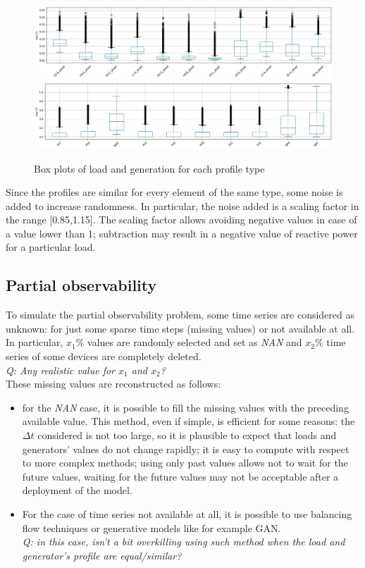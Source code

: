 \begin{figure}[H]
\centering
    \includegraphics[width=.8\linewidth]{images/MVOberr/BoxPlotLoad.png}
    \includegraphics[width=.8\linewidth]{images/MVOberr/BoxPlotRes.png}
\caption{Box plots of load and generation for each profile type}
\label{fig:gym_anm_net}
\end{figure}

Since the profiles are similar for every element of the same type, some noise is added to increase randomness. In particular, the noise added is a scaling factor in the range [0.85,1.15]. The scaling factor allows avoiding negative values in case of a value lower than 1; subtraction may result in a negative value of reactive power for a particular load. \\

\subsection{Partial observability}
To simulate the partial observability problem, some time series are considered as unknown: for just some sparse time steps (missing values) or not available at all. \\

In particular, $x_1\%$ values are randomly selected and set as \emph{NAN} and $x_2\%$ time series of some devices are completely deleted.\\
\emph{Q: Any realistic value for $x_1$ and $x_2$? \label{q:partialobvals}} \\

\noindent These missing values are reconstructed as follows:
\begin{itemize}
    \item for the \emph{NAN} case, it is possible to fill the missing values with the preceding available value. This method, even if simple, is efficient for some reasons: the $\Delta t$ considered is not too large, so it is plausible to expect that loads and generators' values do not change rapidly; it is easy to compute with respect to more complex methods; using only past values allows not to wait for the future values, waiting for the future values may not be acceptable after a deployment of the model.
    
    \item For the case of time series not available at all, it is possible to use balancing flow techniques or generative models like for example \gls{GAN}.\\
    \emph{Q: in this case, isn't a bit overkilling using such method when the load and generator's profile are equal/similar? \label{q:gan}}
\end{itemize}

